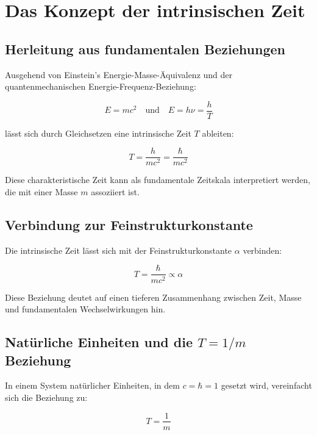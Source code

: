 \documentclass[12pt,a4paper]{article}  %
\begin{document}
	\section{Das Konzept der intrinsischen Zeit}
	
	\subsection{Herleitung aus fundamentalen Beziehungen}
	
	Ausgehend von Einstein's Energie-Masse-Äquivalenz und der quantenmechanischen Energie-Frequenz-Beziehung:
	
	\begin{equation}
		E = mc^2 \quad \text{und} \quad E = h\nu = \frac{h}{T}
	\end{equation}
	
	lässt sich durch Gleichsetzen eine intrinsische Zeit $T$ ableiten:
	
	\begin{equation}
		T = \frac{h}{mc^2} = \frac{\hbar}{mc^2}
	\end{equation}
	
	Diese charakteristische Zeit kann als fundamentale Zeitskala interpretiert werden, die mit einer Masse $m$ assoziiert ist.
	
	\subsection{Verbindung zur Feinstrukturkonstante}
	
	Die intrinsische Zeit lässt sich mit der Feinstrukturkonstante $\alpha$ verbinden:
	
	\begin{equation}
		T = \frac{\hbar}{mc^2} \propto \alpha
	\end{equation}
	
	Diese Beziehung deutet auf einen tieferen Zusammenhang zwischen Zeit, Masse und fundamentalen Wechselwirkungen hin.
	
	\subsection{Natürliche Einheiten und die $T = 1/m$ Beziehung}
	
	In einem System natürlicher Einheiten, in dem $c = \hbar = 1$ gesetzt wird, vereinfacht sich die Beziehung zu:
	
	\begin{equation}
		T = \frac{1}{m}
	\end{equation}
	
\end{document}
